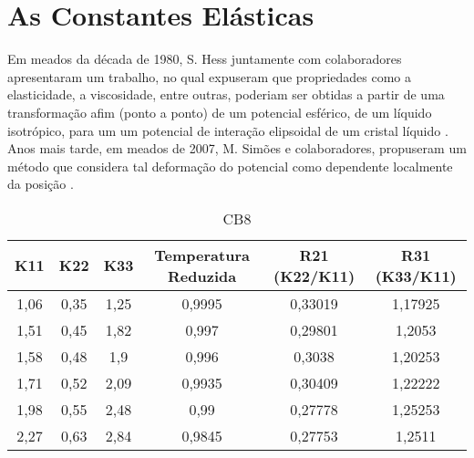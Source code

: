 ﻿\chapter[AS CONSTANTES ELÁSTICAS ]{As Constantes Elásticas}
\label{cap7}

Em meados da década de 1980, S. Hess juntamente com colaboradores apresentaram um trabalho, no qual expuseram que propriedades como a  elasticidade, a viscosidade, entre outras, poderiam ser obtidas a partir de uma transformação afim (ponto a ponto) de um potencial esférico, de um líquido isotrópico,  para um um potencial de interação elipsoidal de um cristal líquido \cite{baalss}. Anos mais tarde, em meados de 2007, M. Simões e colaboradores, propuseram um método que considera tal deformação do potencial como dependente localmente da posição \cite{simoes}. 






\begin{table}[htbp]
  \centering
  \caption{CB8}
    \begin{tabular}{cccccc}
    \hline
    K11   & K22   & K33   & Temperatura Reduzida & R21 (K22/K11)  & R31 (K33/K11) \\
    \hline
    1,06  & 0,35  & 1,25  & 0,9995 & 0,33019 & 1,17925 \\
    1,51  & 0,45  & 1,82  & 0,997 & 0,29801 & 1,2053 \\
    1,58  & 0,48  & 1,9   & 0,996 & 0,3038 & 1,20253 \\
    1,71  & 0,52  & 2,09  & 0,9935 & 0,30409 & 1,22222 \\
    1,98  & 0,55  & 2,48  & 0,99  & 0,27778 & 1,25253 \\
    2,27  & 0,63  & 2,84  & 0,9845 & 0,27753 & 1,2511 \\
    \hline
    \end{tabular}%
  \label{tabcb8}%
\end{table}%

